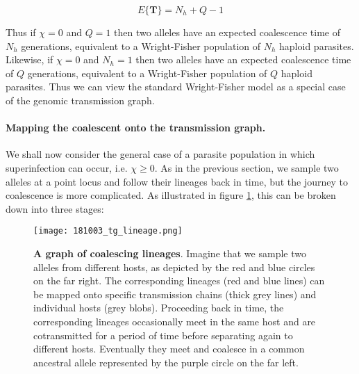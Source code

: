\documentclass[_main.tex]{subfiles}
\begin{document}
\begin{equation*}
\label{eq:Nh+Q-1}
E \{ \textbf{T} \}   
= N_h + Q - 1
\end{equation*}

Thus if $\chi=0$ and $Q = 1$ then two alleles have an expected coalescence time of $N_h$ generations, equivalent to a Wright-Fisher population of $N_h$ haploid parasites.  Likewise, if $\chi=0$ and $N_h = 1$ then two alleles have an expected coalescence time of $Q$ generations, equivalent to a Wright-Fisher population of $Q$ haploid parasites.  Thus we can view the standard Wright-Fisher model as a special case of the genomic transmission graph.

\paragraph{Mapping the coalescent onto the transmission graph.}
\label{main_map_coalescent}

We shall now consider the general case of a parasite population in which superinfection can occur, i.e. $\chi \ge 0$.  As in the previous section, we sample two alleles at a point locus and follow their lineages back in time, but the journey to coalescence is more complicated.  As illustrated in figure \ref{fig:graph_1}, this can be broken down into three stages:

\begin{figure}[h!]
\centering
\texttt{[image: 181003\_tg\_lineage.png]}
\caption{\textbf{A graph of coalescing lineages}.  Imagine that we sample two alleles from different hosts, as depicted by the red and blue circles on the far right.  The corresponding lineages (red and blue lines) can be mapped onto specific transmission chains (thick grey lines) and individual hosts (grey blobs).   Proceeding back in time, the corresponding lineages occasionally meet in the same host and are cotransmitted for a period of time before separating again to different hosts.  Eventually they meet and coalesce in a common ancestral allele represented by the purple circle on the far left.}
\label{fig:graph_1}
\end{figure}
\end{document}

